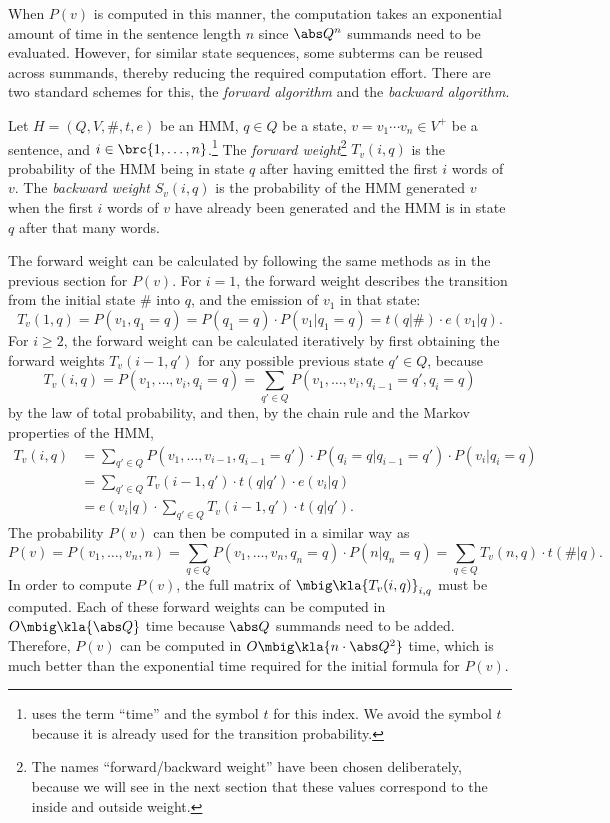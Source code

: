 When $P(v)$ is computed in this manner, the computation takes an exponential
amount of time in the sentence length $n$ since $\abs Q^n$ summands need to be
evaluated. However, for similar state sequences, some subterms can be reused
across summands, thereby reducing the required computation effort. There are
two standard schemes for this, the \emph{forward algorithm} and the
\emph{backward algorithm}.

\begin{definition}
 Let $H=(Q,V,\#,t,e)$ be an HMM, $q\in Q$ be a state, $v=v_1\cdots v_n\in V^+$
 be a sentence, and $i\in\brc{1,\ldots,n}$.\footnote{\cite{jm09} uses the
 term ``time'' and the symbol $t$ for this index. We avoid the symbol $t$
 because it is already used for the transition probability.} The \emph{forward
 weight}\footnote{The names ``forward/backward weight'' have been chosen
 deliberately, because we will see in the next section that these values
 correspond to the inside and outside weight.} $T_v(i,q)$ is the probability
 of the HMM being in state $q$ after having emitted the first $i$ words of
 $v$. The \emph{backward weight} $S_v(i,q)$ is the probability of the HMM
 generated $v$ when the first $i$ words of $v$ have already been generated and
 the HMM is in state $q$ after that many words.
\end{definition}

The forward weight can be calculated by following the same methods as in the
previous section for $P(v)$. For $i = 1$, the forward weight describes the
transition from the initial state $\#$ into $q$, and the emission of $v_1$ in
that state:
\[
 T_v(1,q) = P(v_1,q_1=q) = P(q_1=q) \cdot P(v_1|q_1=q) = t(q|\#) \cdot e(v_1|q).
\]
For $i\geq 2$, the forward weight can be calculated iteratively by first
obtaining the forward weights $T_v(i-1,q')$ for any possible previous state
$q'\in Q$, because
\[
 T_v(i,q) = P(v_1,\ldots,v_i,q_i=q) = \sum_{q'\in Q} P(v_1,\ldots,v_i,q_{i-1}=q',q_i=q)
\]
by the law of total probability, and then, by the chain rule and the Markov
properties of the HMM,
\begin{align*}
 T_v(i,q)
  &= \sum_{q'\in Q} P(v_1,\ldots,v_{i-1},q_{i-1}=q') \cdot P(q_i=q|q_{i-1}=q') \cdot P(v_i|q_i=q) \\
  &= \sum_{q'\in Q} T_v(i-1,q') \cdot t(q|q') \cdot e(v_i|q) \\
  &= e(v_i|q) \cdot \sum_{q'\in Q} T_v(i-1,q') \cdot t(q|q').
\end{align*}
The probability $P(v)$ can then be computed in a similar way as
\[
 P(v) = P(v_1,\ldots,v_n,n) = \sum_{q\in Q} P(v_1,\ldots,v_n,q_n=q) \cdot P(n|q_n=q) = \sum_{q\in Q} T_v(n,q) \cdot t(\#|q).
\]
In order to compute $P(v)$, the full matrix of $\mbig\kla{T_v(i,q)}_{i,q}$ must
be computed. Each of these forward weights can be computed in $O\mbig\kla{\abs
Q}$ time because $\abs Q$ summands need to be added. Therefore, $P(v)$ can be
computed in $O\mbig\kla{n \cdot \abs Q^2}$ time, which is much better than the
exponential time required for the initial formula for $P(v)$.

